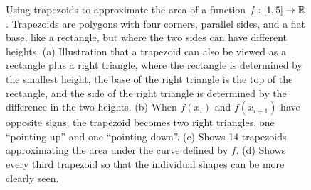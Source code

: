 \begin{figure}[htb]%
\centering
{}%
\hspace{5cm}%
%
\newline
\centering
{}%
\hspace{5pt}%
%
    \caption[]{Using trapezoids to approximate the area of a function $f:[1, 5] \to \mathbb R$.  Trapezoids are polygons with four corners, parallel sides, and a flat base, like a rectangle, but where the two sides can have different heights. (a) Illustration that a trapezoid can also be viewed as a rectangle plus a right triangle, where the rectangle is determined by the smallest height, the base of the right triangle is the top of the rectangle, and the side of the right triangle is determined by the difference in the two heights. (b) When $f(x_i)$ and $f(x_{i+1})$ have opposite signs, the trapezoid becomes two right triangles, one ``pointing up'' and one ``pointing down''. (c) Shows 14 trapezoids approximating the area under the curve defined by $f$. (d) Shows every third trapezoid so that the individual shapes can be more clearly seen.}
    \label{fig:Trapezoids}
\end{figure}

